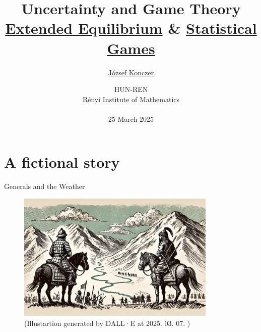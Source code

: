 \documentclass{beamer}
\theoremstyle{definition}
\begin{document}




\title[Uncertainty and Game Theory]{Uncertainty and Game Theory \\ {\small \href{https://arxiv.org/abs/2503.01889}{Extended Equilibrium} \& \href{https://arxiv.org/abs/2402.15892}{Statistical Games}}}
\author{\href{https://konczer.github.io/}{József Konczer}}
\date{HUN-REN  \\ Rényi Institute of Mathematics
\\
\
\\
25 March 2025}

\begin{frame}
\titlepage
\end{frame}





\section{A fictional story}



\begin{frame}{Generals and the Weather }

    \begin{figure}
    \centering
        \includegraphics[width=0.85\textwidth]{img/GW.jpg}
        \caption{\small \centering (Illustartion generated by DALL·E at 2025. 03. 07. )}
    \end{figure}
    
\end{frame}
\end{document}
